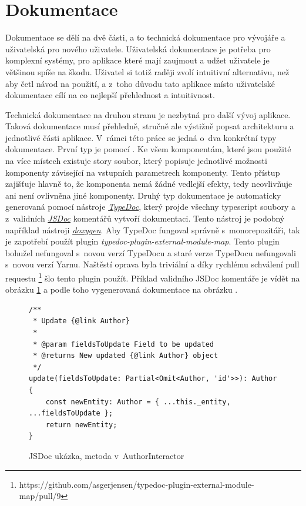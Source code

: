 \section{Dokumentace}
\label{sc:documentation}
Dokumentace se dělí na dvě části, a to technická dokumentace pro vývojáře a uživatelská pro nového uživatele. Uživatelská dokumentace je potřeba pro komplexní systémy, pro aplikace které mají zaujmout a udžet uživatele je většinou spíše na škodu. Uživatel si totiž raději zvolí intuitivní alternativu, než aby četl návod na použití, a z~toho důvodu tato aplikace místo uživatelské dokumentace cílí na co nejlepší přehlednost a intuitivnost.

Technická dokumentace na druhou stranu je nezbytná pro další vývoj aplikace. Taková dokumentace musí přehledně, stručně ale výstižně popsat architekturu a jednotlivé části aplikace. V~rámci této práce se jedná o~dva konkrétní typy dokumentace. První typ je pomocí . Ke všem komponentám, které jsou použité na více místech existuje story soubor, který popisuje jednotlivé možnosti komponenty závisející na vstupních parametrech komponenty. Tento přístup zajišťuje hlavně to, že komponenta nemá žádné vedlejší efekty, tedy neovlivňuje ani není ovlivněna jiné komponenty. Druhý typ dokumentace je automaticky generovaná pomocí nástroje \href{https://typedoc.org/}{\emph{TypeDoc}}, který projde všechny typescript soubory a z~validních \href{https://jsdoc.app/}{\emph{JSDoc}} komentářů vytvoří dokumentaci. Tento nástroj je podobný například nástroji \href{http://www.doxygen.nl/}{\emph{doxygen}}. Aby TypeDoc fungoval správně s~monorepozitáři, tak je zapotřebí použít plugin \emph{typedoc-plugin-external-module-map}. Tento plugin bohužel nefungoval s~novou verzí TypeDocu a staré verze TypeDocu nefungovali s~novou verzí Yarnu. Naštěstí oprava byla triviální a díky rychlému schválení pull requestu \footnote{https://github.com/asgerjensen/typedoc-plugin-external-module-map/pull/9} šlo tento plugin použít. Příklad validního JSDoc komentáře je vídět na obrázku \ref{code:jsdoc} a podle toho vygenerovaná dokumentace na obrázku \cite{fig:documentation_example}.

\begin{figure}[h!]
    \centering
    \begin{verbatim}
/**
 * Update {@link Author}
 *
 * @param fieldsToUpdate Field to be updated
 * @returns New updated {@link Author} object
 */
update(fieldsToUpdate: Partial<Omit<Author, 'id'>>): Author {
    const newEntity: Author = { ...this._entity, ...fieldsToUpdate };
    return newEntity;
}
    \end{verbatim}
    \caption{JSDoc ukázka, metoda v~AuthorInteractor}
    \label{code:jsdoc}
\end{figure}

